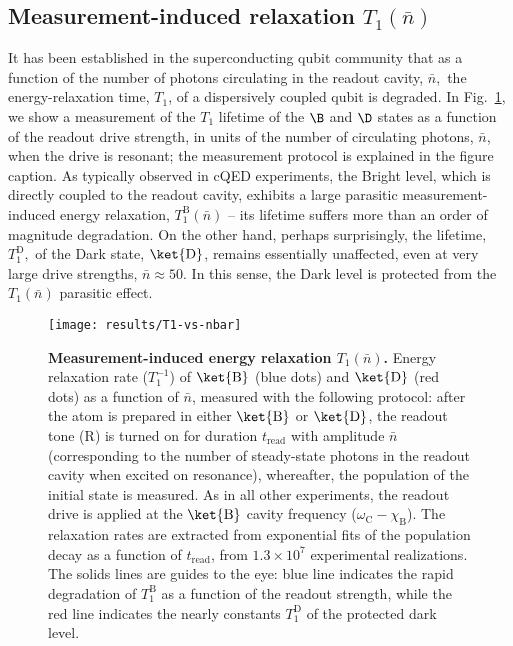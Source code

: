 \subsection{Measurement-induced relaxation\textit{ $T_{1}(\bar{n})$\label{subsec:Measurement-induced-relaxation}}}

It has been established in the superconducting qubit community \citep{Boissonneault2009-Photon-induced-relax,Slichter2012,Sank2016-T1vsNbar,Slichter2016-T1vsNbar}
that as a function of the number of photons circulating in the readout
cavity, $\bar{n},$ the energy-relaxation time, $T_{1}$, of a dispersively
coupled qubit is degraded. In Fig.~\ref{fig:T1-vs-nbar}, we show
a measurement of the $T_{1}$ lifetime of the $\B$ and $\D$ states
as a function of the readout drive strength, in units of the number
of circulating photons, $\bar{n}$, when the drive is resonant; the
measurement protocol is explained in the figure caption. As typically
observed in cQED experiments, the Bright level, which is directly
coupled to the readout cavity, exhibits a large parasitic measurement-induced
energy relaxation, $T_{1}^{\mathrm{B}}\left(\bar{n}\right)$ -- its
lifetime suffers more than an order of magnitude degradation. On the
other hand, perhaps surprisingly, the lifetime, $T_{1}^{\mathrm{D}},$
of the Dark state, $\ket{\mathrm{D}}$, remains essentially unaffected,
even at very large drive strengths, $\bar{n}\approx50$. In this sense,
the Dark level is protected from the $T_{1}\left(\bar{n}\right)$
parasitic effect.

\begin{figure}
\begin{centering}
\texttt{[image: results/T1-vs-nbar]}
\par\end{centering}
\caption[Measurement-induced energy relaxation $T_{1}(\bar{n})$]{\label{fig:T1-vs-nbar}\textbf{Measurement-induced energy relaxation
$T_{1}(\bar{n})$.} Energy relaxation rate ($T_{1}^{-1}$) of $\ket{\mathrm{B}}$
(blue dots) and $\ket{\mathrm{D}}$ (red dots) as a function of $\bar{n}$,
measured with the following protocol: after the atom is prepared in
either $\ket{\mathrm{B}}$ or $\ket{\mathrm{D}}$, the readout tone
($\mathrm{R}$) is turned on for duration $t_{\mathrm{read}}$ with
amplitude $\bar{n}$ (corresponding to the number of steady-state
photons in the readout cavity when excited on resonance), whereafter,
the population of the initial state is measured. As in all other experiments,
the readout drive is applied at the $\ket{\mathrm{B}}$ cavity frequency
($\omega_{\mathrm{C}}-\chi_{\mathrm{B}}$). The relaxation rates are
extracted from exponential fits of the population decay as a function
of $t_{\mathrm{read}}$, from $1.3\times10^{7}$ experimental realizations.
The solids lines are guides to the eye: blue line indicates the rapid
degradation of $T_{1}^{\mathrm{B}}$ as a function of the readout
strength, while the red line indicates the nearly constants $T_{1}^{\mathrm{D}}$
of the protected dark level.}
\end{figure}


